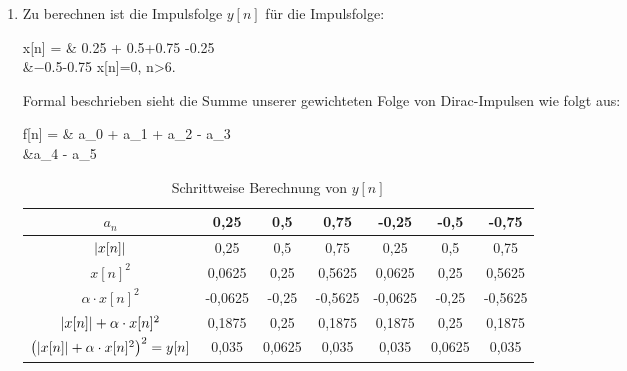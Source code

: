 \begin{enumerate}[label=\alph*)]
	\lstset{language=matlab}
	\item Zu berechnen ist die Impulsfolge $y[n]$ für die Impulsfolge: \\[1.5ex]
	{
		\setlength{\abovedisplayskip}{0pt}
		\setlength{\belowdisplayskip}{6pt}
		\setlength{\abovedisplayshortskip}{0pt}
		\setlength{\belowdisplayshortskip}{0pt}
		\begin{flalign*}
			x[n] = & \num{0,25} \cdot \delta[n] + \num{0,5}\cdot \delta[n-1]+\num{0,75} \cdot\delta[n-2]-\num{0,25} \cdot\delta[n-3] \\
			&\num{-0,5}\cdot\delta[n-4]-\num{0,75}\cdot\delta[n-5] \quad {} \quad x[n]=0, n>6.
		\end{flalign*}
	}
	Formal beschrieben sieht die Summe unserer gewichteten Folge von Dirac-Impulsen wie folgt aus:
	{
		\setlength{\abovedisplayskip}{0pt}
		\setlength{\belowdisplayskip}{6pt}
		\setlength{\abovedisplayshortskip}{0pt}
		\setlength{\belowdisplayshortskip}{0pt}
		\begin{flalign*}
			f[n] = & a_0 \cdot \delta[n] + a_1 \cdot \delta[n-1] + a_2 \cdot \delta[n-2] - a_3 \cdot \delta[n-3] \\
			&a_4 \cdot \delta[n-4] - a_5 \cdot \delta[n-5]
		\end{flalign*}
	}
	\begin{table}[H]
		\centering
		\caption{Schrittweise Berechnung von $y[n]$}
		\begin{tabular}{|c|c|c|c|c|c|c|}
			\hline
			\ccgray $a_n$											& 0,25 & 0,5 & 0,75 & -0,25 & -0,5 & -0,75 \\
			\hline
			\ccgray $\lvert x[n]\rvert$ 									& 0,25 & 0,5 & 0,75 & 0,25 & 0,5 & 0,75 \\
			\hline
			\ccgray $x[n]^2$ 										&  0,0625 &  0,25  &  0,5625 &  0,0625 &    0,25 &  0,5625 \\
			\hline
			\ccgray $\alpha\cdot{x[n]^2}$							& -0,0625 & -0,25  & -0,5625 & -0,0625 &   -0,25 & -0,5625 \\
			\hline
			\ccgray $\lvert x[n]\rvert + \alpha \cdot{x[n]^2}$				&  0,1875 &  0,25  &  0,1875 &  0,1875 &    0,25 &  0,1875 \\
			\hline
			\ccgray $\left(\lvert x[n]\rvert + \alpha \cdot{x[n]^2}\right)^2 = y[n]$	&  0,035  &  0,0625 &  0,035  &  0,035 &  0,0625 &  0,035 \\
			\hline
		\end{tabular}
	\end{table}
	

\end{enumerate}
